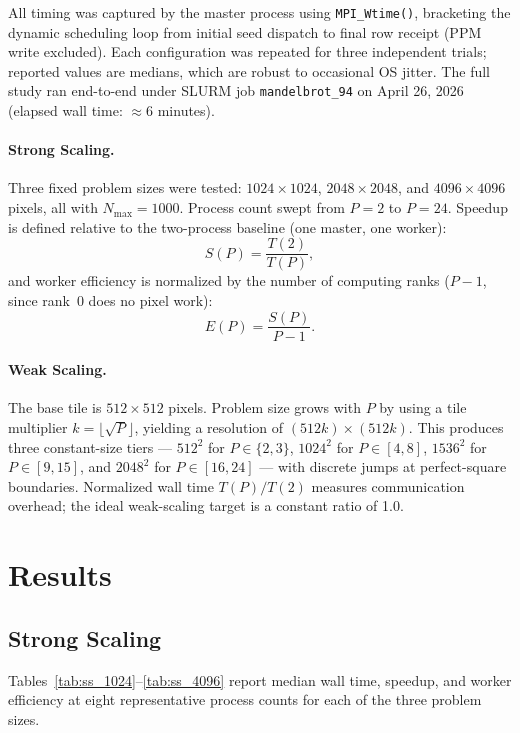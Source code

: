 \documentclass[11pt]{article}
\begin{document}
All timing was captured by the master process using \texttt{MPI\_Wtime()},
bracketing the dynamic scheduling loop from initial seed dispatch to final row
receipt (PPM write excluded). Each configuration was repeated for three
independent trials; reported values are medians, which are robust to
occasional OS jitter. The full study ran end-to-end under SLURM job
\texttt{mandelbrot\_94} on April 26, 2026 (elapsed wall time: $\approx 6$
minutes).

\paragraph{Strong Scaling.} Three fixed problem sizes were tested:
$1024\!\times\!1024$, $2048\!\times\!2048$, and $4096\!\times\!4096$ pixels,
all with $N_{\max} = 1000$. Process count swept from $P = 2$ to $P = 24$.
Speedup is defined relative to the two-process baseline (one master, one
worker):
\[
  S(P) = \frac{T(2)}{T(P)},
\]
and worker efficiency is normalized by the number of computing ranks
($P - 1$, since rank~0 does no pixel work):
\[
  E(P) = \frac{S(P)}{P - 1}.
\]

\paragraph{Weak Scaling.} The base tile is $512\!\times\!512$ pixels. Problem
size grows with $P$ by using a tile multiplier $k = \lfloor\sqrt{P}\rfloor$,
yielding a resolution of $(512k)\!\times\!(512k)$. This produces three
constant-size tiers — $512^2$ for $P \in \{2,3\}$, $1024^2$ for
$P \in [4,8]$, $1536^2$ for $P \in [9,15]$, and $2048^2$ for $P \in [16,24]$
— with discrete jumps at perfect-square boundaries. Normalized wall time
$T(P)/T(2)$ measures communication overhead; the ideal weak-scaling target
is a constant ratio of 1.0.

\section{Results}

\subsection{Strong Scaling}

Tables~\ref{tab:ss_1024}--\ref{tab:ss_4096} report median wall time, speedup,
and worker efficiency at eight representative process counts for each of the
three problem sizes.
\end{document}

